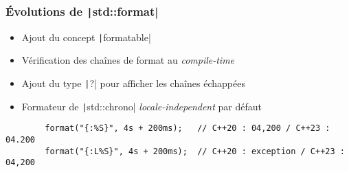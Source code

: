 \documentclass[C++.tex]{subfiles}
\begin{document}
\begin{frame}[fragile]
	\frametitle{Évolutions de \texttt|std::format|}
	\begin{itemize}
		\item Ajout du concept \texttt|formatable|
		\item Vérification des chaînes de format au \textit{compile-time}
		\item Ajout du type \texttt|?| pour afficher les chaînes échappées
		\item Formateur de \texttt|std::chrono| \textit{locale-independent} par défaut
	\end{itemize}

	\begin{verbatim}
		format("{:%S}", 4s + 200ms);   // C++20 : 04,200 / C++23 : 04.200
		format("{:L%S}", 4s + 200ms);  // C++20 : exception / C++23 : 04,200
	\end{verbatim}

\end{frame}
\end{document}
